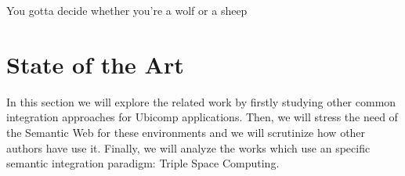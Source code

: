 

\begin{savequote}[50mm]
You gotta decide whether you’re a wolf or a sheep
%
\end{savequote}


\chapter{State of the Art}
\label{cha:stateoftheart}

\ifpdf
    \graphicspath{{2_state_of_the_art/figures/PNG/}{2_state_of_the_art/figures/PDF/}{2_state_of_the_art/figures/}}
\else
    \graphicspath{{2_state_of_the_art/figures/EPS/}{2_state_of_the_art/figures/}}
\fi




In this section we will explore the related work by firstly studying other common integration approaches for Ubicomp applications.
Then, we will stress the need of the Semantic Web for these environments and we will scrutinize how other authors have use it.
Finally, we will analyze the works which use an specific semantic integration paradigm: Triple Space Computing.











